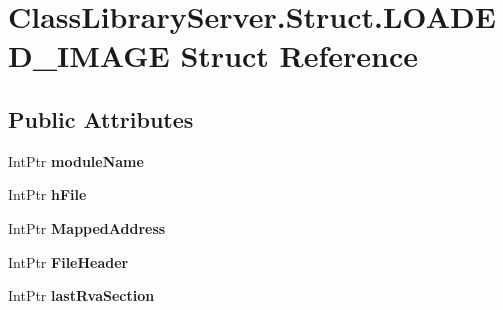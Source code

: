 \hypertarget{struct_class_library_server_1_1_struct_1_1_l_o_a_d_e_d___i_m_a_g_e}{}\section{Class\+Library\+Server.\+Struct.\+L\+O\+A\+D\+E\+D\+\_\+\+I\+M\+A\+GE Struct Reference}
\label{struct_class_library_server_1_1_struct_1_1_l_o_a_d_e_d___i_m_a_g_e}
\subsection*{Public Attributes}
\begin{DoxyCompactItemize}
\item 
\mbox{\label{struct_class_library_server_1_1_struct_1_1_l_o_a_d_e_d___i_m_a_g_e_a3faa9b3b0f2efa60ec456195f9b77e09}} 
Int\+Ptr {\bfseries module\+Name}
\item 
\mbox{\label{struct_class_library_server_1_1_struct_1_1_l_o_a_d_e_d___i_m_a_g_e_af1430aa11720ab56718d245148c52f54}} 
Int\+Ptr {\bfseries h\+File}
\item 
\mbox{\label{struct_class_library_server_1_1_struct_1_1_l_o_a_d_e_d___i_m_a_g_e_aa1ca7820df06c78b5f5041f8865584ff}} 
Int\+Ptr {\bfseries Mapped\+Address}
\item 
\mbox{\label{struct_class_library_server_1_1_struct_1_1_l_o_a_d_e_d___i_m_a_g_e_a75834c127ac8c2c5e856b0249a92fd9a}} 
Int\+Ptr {\bfseries File\+Header}
\item 
\mbox{\label{struct_class_library_server_1_1_struct_1_1_l_o_a_d_e_d___i_m_a_g_e_ae2b986ddcf4c7e68fd2cfa7e4f9f07f7}} 
Int\+Ptr {\bfseries last\+Rva\+Section}
\item 
\mbox{\label{struct_class_library_server_1_1_struct_1_1_l_o_a_d_e_d___i_m_a_g_e_a8e02b715a27dbd6397b807e671e7dce6}} 

\end{DoxyCompactItemize}
